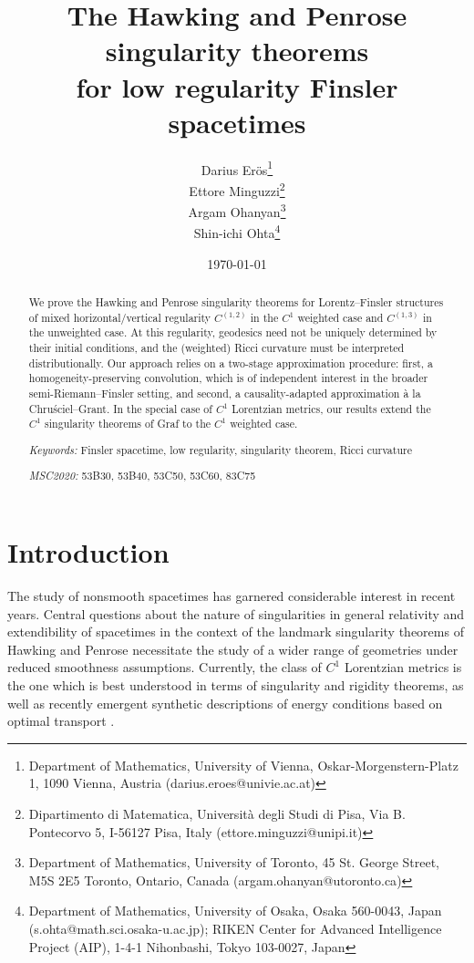 \documentclass[a4paper,11pt]{article}
\title{The Hawking and Penrose singularity theorems\\ for low regularity Finsler spacetimes}
\author{Darius Er\"os\thanks{Department of Mathematics, University of Vienna, Oskar-Morgenstern-Platz 1, 1090 Vienna, Austria (\textsf{darius.eroes@univie.ac.at})}\\
Ettore Minguzzi\thanks{Dipartimento di Matematica, Università degli Studi di Pisa, Via B. Pontecorvo 5, I-56127
Pisa, Italy (\textsf{ettore.minguzzi@unipi.it})}\\
Argam Ohanyan\thanks{Department of Mathematics, University of Toronto, 45 St. George Street, M5S 2E5 Toronto, Ontario, Canada (\textsf{argam.ohanyan@utoronto.ca})}\\
Shin-ichi Ohta\thanks{
Department of Mathematics, University of Osaka, Osaka 560-0043, Japan
(\textsf{s.ohta@math.sci.osaka-u.ac.jp});
RIKEN Center for Advanced Intelligence Project (AIP),
1-4-1 Nihonbashi, Tokyo 103-0027, Japan}
}
\numberwithin{equation}{section}
\theoremstyle{definition}
\theoremstyle{plain}
\begin{document}
\date{\today}


\maketitle

\begin{abstract}
We prove the Hawking and Penrose singularity theorems for Lorentz--Finsler structures of mixed horizontal/vertical regularity $C^{(1,2)}$ in the $C^1$ weighted case and $C^{(1,3)}$ in the unweighted case.
At this regularity, geodesics need not be uniquely determined by their initial conditions, and the (weighted) Ricci curvature must be interpreted distributionally.
Our approach relies on a two-stage approximation procedure: first, a homogeneity-preserving convolution, which is of independent interest in the broader semi-Riemann--Finsler setting, and second, a causality-adapted approximation à la Chru{\'s}ciel--Grant.
In the special case of $C^1$ Lorentzian metrics, our results extend the $C^1$ singularity theorems of Graf to the $C^1$ weighted case.

\vspace{1em}

\noindent
\emph{Keywords:} Finsler spacetime, low regularity, singularity theorem, Ricci curvature
\medskip

\noindent
\emph{MSC2020:} 53B30, 53B40, 53C50, 53C60, 83C75

\end{abstract}
\tableofcontents
\section{Introduction}

The study of nonsmooth spacetimes has garnered considerable interest in recent years. 
Central questions about the nature of singularities in general relativity and extendibility of spacetimes in the context of the landmark singularity theorems of Hawking and Penrose necessitate the study of a wider range of geometries under reduced smoothness assumptions. 
Currently, the class of $C^1$ Lorentzian metrics is the one which is best understood in terms of singularity \cite{Graf-SingularityC1, KOSS, SchinnerlSteinbauer} and rigidity \cite{KOV, quintetnonsmooth} theorems, as well as recently emergent synthetic descriptions of energy conditions based on optimal transport \cite{BraunCalisti}.
\end{document}
